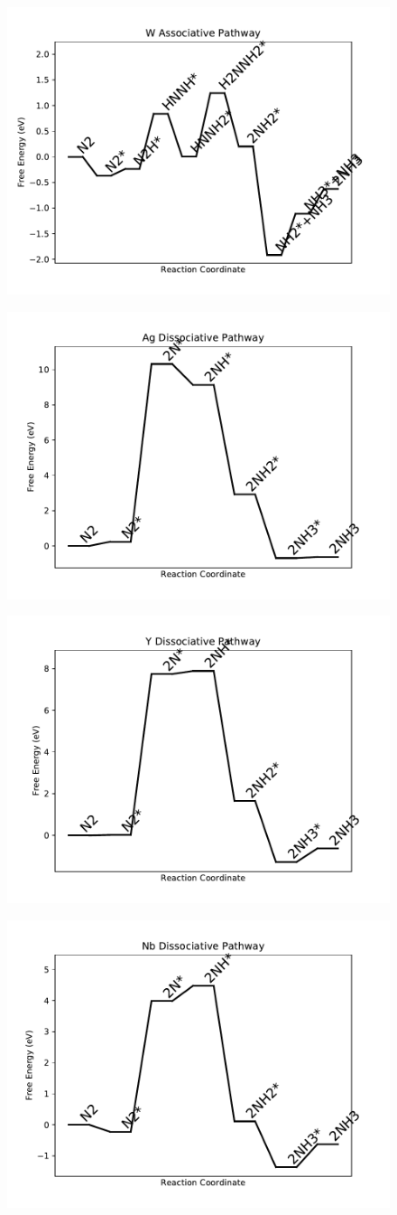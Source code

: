 \begin{figure}
\includegraphics[width=0.5\linewidth]{data/plots/W_associative.pdf}
\label{fig:W_associative}
\end{figure}

\begin{figure}
\includegraphics[width=0.5\linewidth]{data/plots/Ag_dissociative.pdf}
\label{fig:Ag_dissociative}
\end{figure}

\begin{figure}
\includegraphics[width=0.5\linewidth]{data/plots/Y_dissociative.pdf}
\label{fig:Y_dissociative}
\end{figure}

\begin{figure}
\includegraphics[width=0.5\linewidth]{data/plots/Nb_dissociative.pdf}
\label{fig:Nb_dissociative}
\end{figure}

